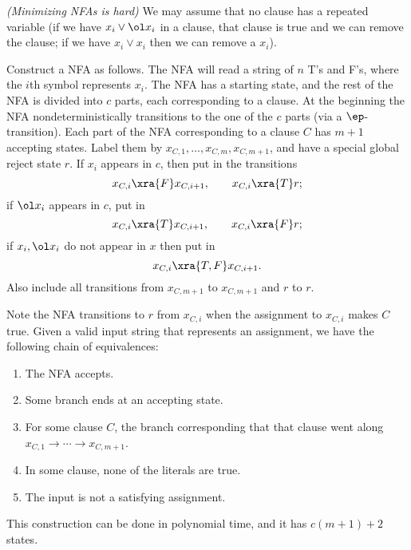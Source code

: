 \pagebreak

\begin{problem}{\it(Minimizing NFAs is hard)}
We may assume that no clause has a repeated variable (if we have $x_i\vee \ol x_i$ in a clause, that clause is true and we can remove the clause; if we have $x_i\vee x_i$ then we can remove a $x_i$).

Construct a NFA as follows. The NFA will read a string of $n$ T's and F's, where the $i$th symbol represents $x_i$. The NFA has a starting state, and the rest of the NFA is divided into $c$ parts, each corresponding to a clause. At the beginning the NFA nondeterministically transitions to the one of the $c$ parts (via a $\ep$-transition).
Each part of the NFA corresponding to a clause $C$ has $m+1$ accepting states. Label them by $x_{C,1},\ldots, x_{C,m},x_{C,m+1}$, and have a special global reject state $r$. If $x_i$ appears in $c$, then put in the transitions
\[
x_{C,i}\xra{F} x_{C,i+1},\qquad x_{C,i}\xra{T} r;
\]
if $\ol x_i$ appears in $c$, put in
\[
x_{C,i}\xra{T} x_{C,i+1},\qquad x_{C,i}\xra{F} r;
\]
if $x_i,\ol x_i$ do not appear in $x$ then put in
\[
x_{C,i}\xra{T,F} x_{C,i+1}.
\]
Also include all transitions from $x_{C,m+1}$ to $x_{C,m+1}$ and $r$ to $r$.

Note the NFA transitions to $r$ from $x_{C,i}$ when the assignment to $x_{C,i}$ makes $C$ true. 
Given a valid input string that represents an assignment, we have the following chain of equivalences:
\begin{enumerate}
\item
The NFA accepts.
\item
Some branch ends at an accepting state.
\item
For some clause $C$, the branch corresponding that that clause went along $x_{C,1}\to \cdots \to x_{C,m+1}$.
\item 
In some clause, none of the literals are true. 
\item
The input is not a satisfying assignment.
\end{enumerate}


This construction can be done in polynomial time, and it has $c(m+1)+2$ states.


\end{problem}
